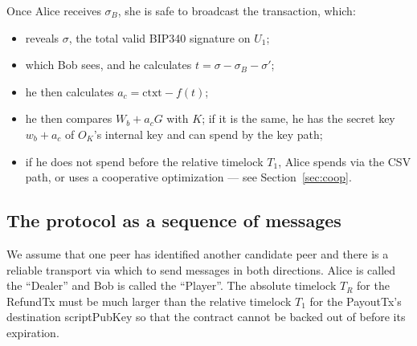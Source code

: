 \documentclass[11pt]{article}
\begin{document}
Once Alice receives $\sigma_B$, she is safe to broadcast the transaction, which:

\begin{itemize}
\item reveals $\sigma$, the total valid BIP340 signature on $U_1$;
\item which Bob sees, and he calculates $t = \sigma - \sigma_B - \sigma'$;
\item he then calculates $a_c = \textrm{ctxt} - f(t)$;
\item he then compares $W_b + a_c G$ with $K$; if it is the same, he has the secret key $w_b+a_c$ of $O_K$'s internal key and can spend by the key path;
\item if he does not spend before the relative timelock $T_1$, Alice spends via the CSV path, or uses a cooperative optimization --- see Section~\ref{sec:coop}.
\end{itemize}

\subsection{The protocol as a sequence of messages}

We assume that one peer has identified another candidate peer and there is a reliable transport via which to send messages in both directions. Alice is called the ``Dealer'' and Bob is called the ``Player''. The absolute timelock $T_R$ for the RefundTx must be much larger than the relative timelock $T_1$ for the PayoutTx's destination scriptPubKey so that the contract cannot be backed out of before its expiration.
\end{document}
